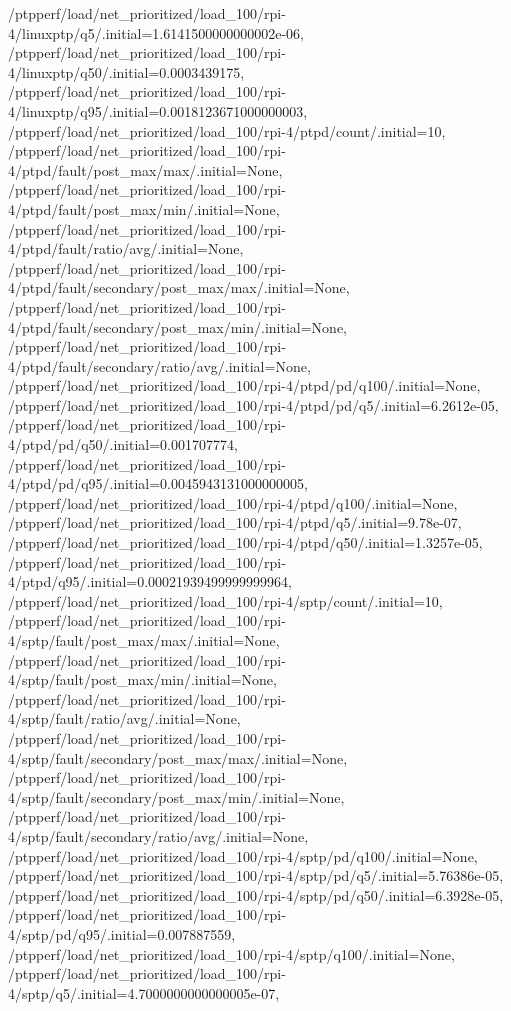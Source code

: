 {    /ptpperf/load/net_prioritized/load_100/rpi-4/linuxptp/q5/.initial=1.6141500000000002e-06,
    /ptpperf/load/net_prioritized/load_100/rpi-4/linuxptp/q50/.initial=0.0003439175,
    /ptpperf/load/net_prioritized/load_100/rpi-4/linuxptp/q95/.initial=0.0018123671000000003,
    /ptpperf/load/net_prioritized/load_100/rpi-4/ptpd/count/.initial=10,
    /ptpperf/load/net_prioritized/load_100/rpi-4/ptpd/fault/post_max/max/.initial=None,
    /ptpperf/load/net_prioritized/load_100/rpi-4/ptpd/fault/post_max/min/.initial=None,
    /ptpperf/load/net_prioritized/load_100/rpi-4/ptpd/fault/ratio/avg/.initial=None,
    /ptpperf/load/net_prioritized/load_100/rpi-4/ptpd/fault/secondary/post_max/max/.initial=None,
    /ptpperf/load/net_prioritized/load_100/rpi-4/ptpd/fault/secondary/post_max/min/.initial=None,
    /ptpperf/load/net_prioritized/load_100/rpi-4/ptpd/fault/secondary/ratio/avg/.initial=None,
    /ptpperf/load/net_prioritized/load_100/rpi-4/ptpd/pd/q100/.initial=None,
    /ptpperf/load/net_prioritized/load_100/rpi-4/ptpd/pd/q5/.initial=6.2612e-05,
    /ptpperf/load/net_prioritized/load_100/rpi-4/ptpd/pd/q50/.initial=0.001707774,
    /ptpperf/load/net_prioritized/load_100/rpi-4/ptpd/pd/q95/.initial=0.0045943131000000005,
    /ptpperf/load/net_prioritized/load_100/rpi-4/ptpd/q100/.initial=None,
    /ptpperf/load/net_prioritized/load_100/rpi-4/ptpd/q5/.initial=9.78e-07,
    /ptpperf/load/net_prioritized/load_100/rpi-4/ptpd/q50/.initial=1.3257e-05,
    /ptpperf/load/net_prioritized/load_100/rpi-4/ptpd/q95/.initial=0.00021939499999999964,
    /ptpperf/load/net_prioritized/load_100/rpi-4/sptp/count/.initial=10,
    /ptpperf/load/net_prioritized/load_100/rpi-4/sptp/fault/post_max/max/.initial=None,
    /ptpperf/load/net_prioritized/load_100/rpi-4/sptp/fault/post_max/min/.initial=None,
    /ptpperf/load/net_prioritized/load_100/rpi-4/sptp/fault/ratio/avg/.initial=None,
    /ptpperf/load/net_prioritized/load_100/rpi-4/sptp/fault/secondary/post_max/max/.initial=None,
    /ptpperf/load/net_prioritized/load_100/rpi-4/sptp/fault/secondary/post_max/min/.initial=None,
    /ptpperf/load/net_prioritized/load_100/rpi-4/sptp/fault/secondary/ratio/avg/.initial=None,
    /ptpperf/load/net_prioritized/load_100/rpi-4/sptp/pd/q100/.initial=None,
    /ptpperf/load/net_prioritized/load_100/rpi-4/sptp/pd/q5/.initial=5.76386e-05,
    /ptpperf/load/net_prioritized/load_100/rpi-4/sptp/pd/q50/.initial=6.3928e-05,
    /ptpperf/load/net_prioritized/load_100/rpi-4/sptp/pd/q95/.initial=0.007887559,
    /ptpperf/load/net_prioritized/load_100/rpi-4/sptp/q100/.initial=None,
    /ptpperf/load/net_prioritized/load_100/rpi-4/sptp/q5/.initial=4.7000000000000005e-07,
}
